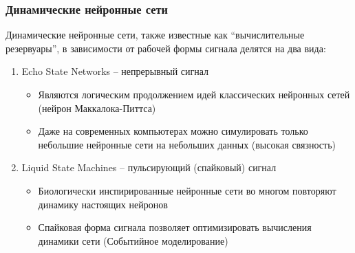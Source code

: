 \documentclass{beamer}
\begin{document}
\begin{frame}
\frametitle{Динамические нейронные сети}
Динамические нейронные сети, также известные как ``вычислительные резервуары'', в зависимости от рабочей формы сигнала делятся на два вида:
\begin{enumerate}
\item Echo State Networks \cite{jaeger} -- непрерывный сигнал\\
\begin{itemize}

\item Являются логическим продолжением идей классических нейронных сетей (нейрон Маккалока-Питтса)
\item Даже на современных компьютерах можно симулировать только небольшие нейронные сети на небольших данных (высокая связность)

\end{itemize}
\item Liquid State Machines \cite{lsm} -- пульсирующий (спайковый) сигнал
\begin{itemize}
\item Биологически инспирированные нейронные сети во многом повторяют динамику настоящих нейронов
\item Спайковая форма сигнала позволяет оптимизировать вычисления динамики сети (Событийное моделирование)
\end{itemize}

\end{enumerate}
\end{frame}
\end{document}
